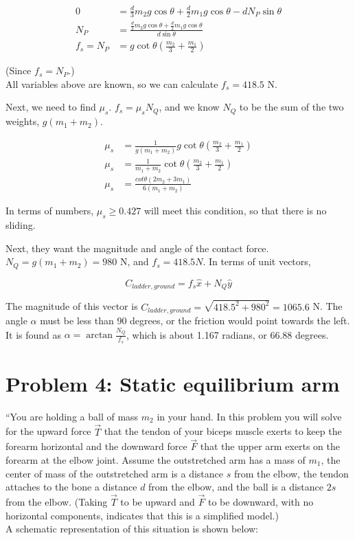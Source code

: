 \documentclass[8.01x]{subfiles}
\begin{document}
\begin{align}
0 &= \frac{d}{3} m_2 g \cos \theta + \frac{d}{2} m_1 g \cos \theta - d N_P \sin \theta\\
N_P &= \frac{\frac{d}{3} m_2 g \cos \theta + \frac{d}{2} m_1 g \cos \theta}{d \sin \theta}\\
f_s = N_P &= g \cot \theta \left(\frac{m_2}{3} + \frac{m_1}{2}\right)
\end{align}

(Since $f_s = N_P$.)\\
All variables above are known, so we can calculate $f_s = 418.5$ N.

Next, we need to find $\mu_s$. $f_s = \mu_s N_Q$, and we know $N_Q$ to be the sum of the two weights, $g(m_1 + m_2)$.

\begin{align}
\mu_s &= \frac{1}{g(m_1 + m_2)} g \cot \theta \left(\frac{m_2}{3} + \frac{m_1}{2}\right)\\
\mu_s &= \frac{1}{m_1 + m_2} \cot \theta \left(\frac{m_2}{3} + \frac{m_1}{2}\right)\\
\mu_s &= \frac{cot \theta(2 m_2 + 3 m_1)}{6(m_1 + m_2)}
\end{align}

In terms of numbers, $\mu_s \ge 0.427$ will meet this condition, so that there is no sliding.

Next, they want the magnitude and angle of the contact force. $N_Q = g(m_1 + m_2) = 980$ N, and $f_s = 418.5 N$. In terms of unit vectors,

\begin{equation}
C_{ladder,ground} = f_s \hat{x} + N_Q \hat{y}
\end{equation}

The magnitude of this vector is $C_{ladder,ground} = \sqrt{418.5^2 + 980^2} = 1065.6$ N. The angle $\alpha$ must be less than 90 degrees, or the friction would point towards the left. It is found as $\displaystyle \alpha = \arctan \frac{N_Q}{f_s}$, which is about 1.167 radians, or 66.88 degrees.

\section{Problem 4: Static equilibrium arm}

``You are holding a ball of mass $m_2$ in your hand. In this problem you will solve for the upward force $\vec{T}$ that the tendon of your biceps muscle exerts to keep the forearm horizontal and the downward force $\vec{F}$ that the upper arm exerts on the forearm at the elbow joint. Assume the outstretched arm has a mass of $m_1$, the center of mass of the outstretched arm is a distance $s$ from the elbow, the tendon attaches to the bone a distance $d$ from the elbow, and the ball is a distance $2s$ from the elbow. (Taking $\vec{T}$ to be upward and $\vec{F}$ to be downward, with no horizontal components, indicates that this is a simplified model.)\\
A schematic representation of this situation is shown below:
\end{document}
